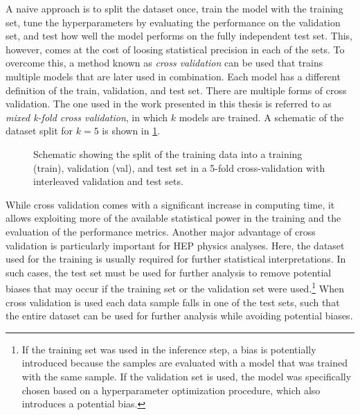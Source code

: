 A naive approach is to split the dataset once, train the model with the training set, tune the hyperparameters by evaluating the performance on the validation set, and test how well the model performs on the fully independent test set. 
This, however, comes at the cost of loosing statistical precision in each of the sets. 
To overcome this, a method known as \emph{cross validation} can be used that trains multiple models that are later used in combination. Each model has a different definition of the train, validation, and test set.
There are multiple forms of cross validation. The one used in the work presented in this thesis is referred to as \emph{mixed k-fold cross validation}, in which $k$ models are trained. A schematic of the dataset split for $k=5$ is shown in \cref{fig:k-fold-method}. 
\begin{figure}[ht]
    \caption{Schematic showing the split of the training data into a training (train), validation (val), and test set in a 5-fold cross-validation with interleaved validation and test sets.}
    \label{fig:k-fold-method}
\end{figure}
While cross validation comes with a significant increase in computing time, it allows exploiting more of the available statistical power in the training and the evaluation of the performance metrics.
Another major advantage of cross validation is particularly important for HEP physics analyses. 
Here, the dataset used for the training is usually required for further statistical interpretations. In such cases, the test set must be used for further analysis to remove potential biases that may occur if the training set or the validation set were used.\footnote{If the training set was used in the inference step, a bias is potentially introduced because the samples are evaluated with a model that was trained with the same sample. If the validation set is used, the model was specifically chosen based on a hyperparameter optimization procedure, which also introduces a potential bias.}
When cross validation is used each data sample falls in one of the test sets, such that the entire dataset can be used for further analysis while avoiding potential biases.

